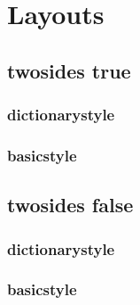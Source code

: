 \section{Layouts}
\newpage
\clearpage
\subsection{twosides true}
    \subsubsection{dictionarystyle} 
        \pagestyle{dictionarystyle}
        \layout
    \clearpage
    \subsubsection{basicstyle}
        \pagestyle{basicstyle}
        \layout
    \clearpage

\subsection{twosides false}
    \subsubsection{dictionarystyle} 
        \pagestyle{dictionarystyle}
        \layout
    \clearpage
    \subsubsection{basicstyle}
        \pagestyle{basicstyle}
        \layout
    \clearpage

\pagestyle{basicstyle}
